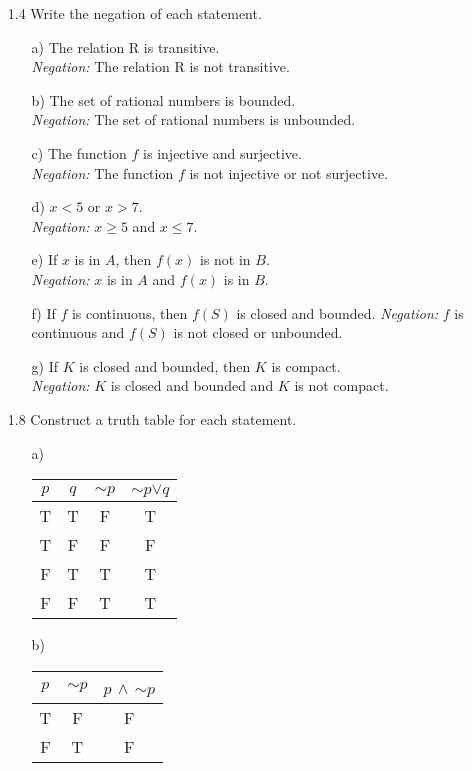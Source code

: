 \documentclass[12pt]{article}
\begin{document}
\begin{enumerate}
\item[1.4] Write the negation of each statement.
\begin{enumerate}
\item[a)] The relation {\large R} is transitive.\\
\emph{Negation:} The relation {\large R} is not transitive.
\item[b)] The set of rational numbers is bounded.\\
\emph{Negation:} The set of rational numbers is unbounded. 
\item[c)] The function $f$ is injective and surjective.\\
\emph{Negation:} The function $f$ is not injective or not surjective. 
\item[d)] $x < 5$ or $x > 7$.\\
\emph{Negation:} $x \geq 5$ and $x \leq 7$. 
\item[e)] If $x$ is in $A$, then $f(x)$ is not in $B$.\\
\emph{Negation:} $x$ is in $A$ and $f(x)$ is in $B$. 
\item[f)] If $f$ is continuous, then $f(S)$ is closed and bounded.
\emph{Negation:} $f$ is continuous and $f(S)$ is not closed or unbounded. 
\item[g)] If $K$ is closed and bounded, then $K$ is compact.\\
\emph{Negation:} $K$ is closed and bounded and $K$ is not compact. 
\end{enumerate}

\item[1.8] Construct a truth table for each statement.
\begin{enumerate}
\item[a)]
\begin{tabular}{c|c|c|c}
\hline
$p$ & $q$ & $\sim$$p$ & $\sim$$p$$\vee$$q$ \\
\hline
T & T & F & T \\ 
T & F & F & F \\ 
F & T & T & T \\
F & F & T & T \\
\hline
\end{tabular}

\item[b)]
\begin{tabular}{c|c|c}
\hline
$p$ & $\sim$$p$ & $p$ $\wedge$ $\sim$$p$ \\
\hline
T & F & F \\
F & T & F \\
\hline
\end{tabular}


\end{enumerate}
\end{enumerate}
\end{document}
